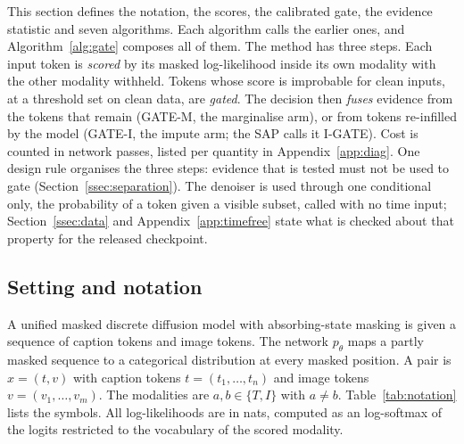 
This section defines the notation, the scores, the calibrated gate, the evidence statistic and seven algorithms.
Each algorithm calls the earlier ones, and Algorithm~\ref{alg:gate} composes all of them.
The method has three steps.
Each input token is \emph{scored} by its masked log-likelihood inside its own modality with the other modality withheld.
Tokens whose score is improbable for clean inputs, at a threshold set on clean data, are \emph{gated}.
The decision then \emph{fuses} evidence from the tokens that remain (GATE-M, the marginalise arm), or from tokens re-infilled by
the model (GATE-I, the impute arm; the SAP calls it I-GATE).
Cost is counted in network passes, listed per quantity in Appendix~\ref{app:diag}.
One design rule organises the three steps: evidence that is tested must not be used to gate (Section~\ref{ssec:separation}).
The denoiser is used through one conditional only, the probability of a token given a visible subset, called with no time
input; Section~\ref{ssec:data} and Appendix~\ref{app:timefree} state what is checked about that property for the released
checkpoint.

\subsection{Setting and notation}\label{ssec:notation}
A unified masked discrete diffusion model with absorbing-state masking is given a sequence of caption tokens and image tokens.
The network $p_\theta$ maps a partly masked sequence to a categorical distribution at every masked position.
A pair is $x=(t,v)$ with caption tokens $t=(t_1,\dots,t_n)$ and image tokens $v=(v_1,\dots,v_m)$.
The modalities are $a,b\in\{T,I\}$ with $a\neq b$.
Table~\ref{tab:notation} lists the symbols.
All log-likelihoods are in nats, computed as an \fp{} log-softmax of the logits restricted to the vocabulary of the scored
modality.

